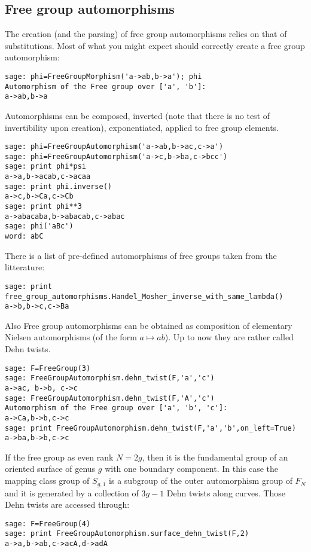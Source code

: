 \documentclass[10pt,a4paper]{article}
\begin{document}
\subsection{Free group automorphisms}

The creation (and the parsing) of free group automorphisms relies on that of
substitutions. Most of what you might expect should correctly create a
free group automorphism:
\begin{verbatim}
sage: phi=FreeGroupMorphism('a->ab,b->a'); phi
Automorphism of the Free group over ['a', 'b']:
a->ab,b->a
\end{verbatim}
Automorphisms can be composed, inverted (note that there is no test
of invertibility upon creation), exponentiated, applied to free group elements.
\begin{verbatim}
sage: phi=FreeGroupAutomorphism('a->ab,b->ac,c->a')
sage: phi=FreeGroupAutomorphism('a->c,b->ba,c->bcc')
sage: print phi*psi
a->a,b->acab,c->acaa
sage: print phi.inverse()
a->c,b->Ca,c->Cb
sage: print phi**3
a->abacaba,b->abacab,c->abac
sage: phi('aBc')
word: abC
\end{verbatim}

There is a list of pre-defined automorphisms of free groups taken from the litterature:
\begin{verbatim}
sage: print free_group_automorphisms.Handel_Mosher_inverse_with_same_lambda()
a->b,b->c,c->Ba
\end{verbatim}

Also Free group automorphisms can be obtained as composition of
elementary Nielsen automorphisms (of the form $a\mapsto
ab$). Up to now they are rather called Dehn twists.
\begin{verbatim}
sage: F=FreeGroup(3)
sage: FreeGroupAutomorphism.dehn_twist(F,'a','c')
a->ac, b->b, c->c
sage: FreeGroupAutomorphism.dehn_twist(F,'A','c')
Automorphism of the Free group over ['a', 'b', 'c']:
a->Ca,b->b,c->c
sage: print FreeGroupAutomorphism.dehn_twist(F,'a','b',on_left=True)
a->ba,b->b,c->c
\end{verbatim}

If the free group as even rank $N=2g$, then it is the fundamental
group of an oriented surface of genus $g$ with one boundary
component. In this case the mapping class group of $S_{g,1}$ is a
subgroup of the outer automorphism group of $F_N$ and it is generated
by a collection of $3g-1$ Dehn twists along curves. Those Dehn
twists are accessed through:
\begin{verbatim}
sage: F=FreeGroup(4)
sage: print FreeGroupAutomorphism.surface_dehn_twist(F,2)
a->a,b->ab,c->acA,d->adA
\end{verbatim}
\end{document}
